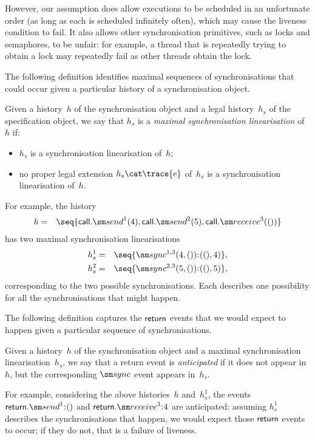 However, our assumption does allow executions to be scheduled in an
unfortunate order (as long as each is scheduled infinitely often), which may
cause the liveness condition to fail.  It also allows other synchronisation
primitives, such as locks and semaphores, to be unfair: for example, a thread
that is repeatedly trying to obtain a lock may repeatedly fail as other
threads obtain the lock.


The following definition identifies maximal sequences of synchronisations
that could occur given a particular history of a synchronisation object.
%
\begin{definition}
Given a history~$h$ of the synchronisation object and a legal history~$h_s$ of
the specification object, we say that $h_s$ is a \emph{maximal synchronisation
  linearisation} of~$h$ if:
\begin{itemize}
\item $h_s$ is a synchronisation linearisation of~$h$;

\item no proper legal extension $h_s \cat \trace{e}$ of~$h_s$ is a
  synchronisation linearisation of~$h$.
\end{itemize}
\end{definition}
%
For example, the history 
\begin{eqnarray*}
h & = &\seq{\call.\send^1(4), \call.\send^2(5), \call.\receive^3(())}
\end{eqnarray*}
has two maximal synchronisation linearisations
\begin{eqnarray*}
h_s^1 & = &  \seq{\sync^{1,3}(4,())\::((),4)}, \\
h_s^2 & = & \seq{\sync^{2,3}(5,())\::((),5)},
\end{eqnarray*}
corresponding to the two possible synchronisations.  Each describes one
possibility for all the synchronisations that might happen. 


The following definition captures the $\mathsf{return}$ events that we would expect to
happen given a particular sequence of synchronisations.
%
\begin{definition}
Given a history~$h$ of the synchronisation object and a maximal
synchronisation linearisation~$h_s$, we say that a return event is
\emph{anticipated} if it does not appear in~$h$, but the corresponding $\sync$
event appears in~$h_s$.
\end{definition}
%
For example, considering the above histories~$h$ and~$h_s^1$, the events
$\return.\send^1\::()$ and $\return.\receive^3\::4$ are anticipated: assuming
$h_s^1$ describes the synchronisations that happen, we would expect those
$\mathsf{return}$ events to occur; if they do not, that is a failure of liveness.  

